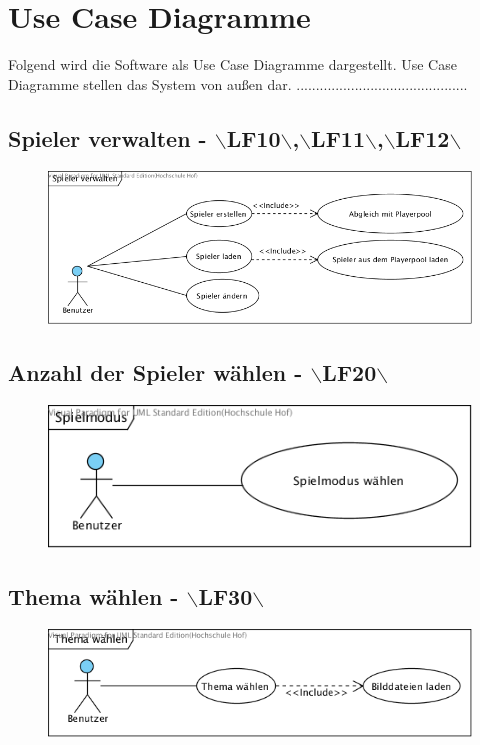 \clearpage

\chapter{Use Case Diagramme}
Folgend wird die Software als Use Case Diagramme dargestellt. Use Case Diagramme stellen das System von außen dar. ............................................

\section{Spieler verwalten - $\backslash$LF10$\backslash$,$\backslash$LF11$\backslash$,$\backslash$LF12$\backslash$}
\begin{figure}[!h]
	\centering
    \includegraphics[width=\textwidth]{./SpielerVerwalten.png}
	\label{layout_gesamt}
\end{figure}

\clearpage
\section{Anzahl der Spieler wählen - $\backslash$LF20$\backslash$}
\begin{figure}[!h]
	\centering
    \includegraphics[width=\textwidth]{./AnzahlSpieler.png}
	\label{layout_gesamt}
\end{figure}

\clearpage
\section{Thema wählen - $\backslash$LF30$\backslash$}
\begin{figure}[!h]
	\centering
    \includegraphics[width=\textwidth]{./Thema.png}
    
	\label{layout_gesamt}
\end{figure}

